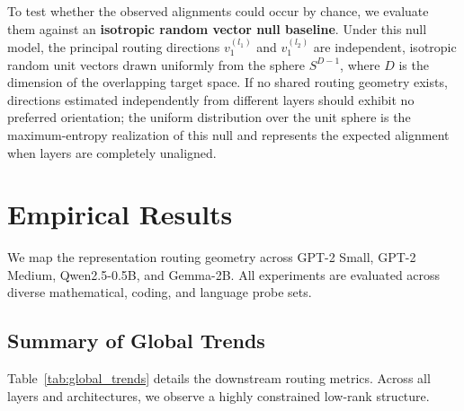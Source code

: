 \documentclass[11pt,a4paper]{article}
\theoremstyle{definition}
\theoremstyle{plain}
\begin{document}
To test whether the observed alignments could occur by chance, we evaluate them against an \textbf{isotropic random vector null baseline}. Under this null model, the principal routing directions $v_1^{(l_1)}$ and $v_1^{(l_2)}$ are independent, isotropic random unit vectors drawn uniformly from the sphere $S^{D-1}$, where $D$ is the dimension of the overlapping target space. If no shared routing geometry exists, directions estimated independently from different layers should exhibit no preferred orientation; the uniform distribution over the unit sphere is the maximum-entropy realization of this null and represents the expected alignment when layers are completely unaligned.

\section{Empirical Results}
\label{sec:results}

We map the representation routing geometry across GPT-2 Small, GPT-2 Medium, Qwen2.5-0.5B, and Gemma-2B. All experiments are evaluated across diverse mathematical, coding, and language probe sets.

\subsection{Summary of Global Trends}
Table~\ref{tab:global_trends} details the downstream routing metrics. Across all layers and architectures, we observe a highly constrained low-rank structure.
\end{document}
